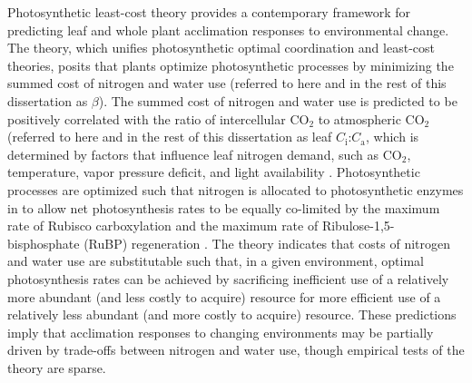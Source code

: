Photosynthetic least-cost theory  provides a contemporary framework for predicting leaf and whole plant acclimation responses to environmental change. The theory, which unifies photosynthetic optimal coordination  and least-cost  theories, posits that plants optimize photosynthetic processes by minimizing the summed cost of nitrogen and water use (referred to here and in the rest of this dissertation as $\beta$). The summed cost of nitrogen and water use is predicted to be positively correlated with the ratio of intercellular CO$_2$ to atmospheric CO$_2$ (referred to here and in the rest of this dissertation as leaf $C_\mathrm{i}$:$C_\mathrm{a}$, which is determined by factors that influence leaf nitrogen demand, such as CO$_2$, temperature, vapor pressure deficit, and light availability . Photosynthetic processes are optimized such that nitrogen is allocated to photosynthetic enzymes in to allow net photosynthesis rates to be equally co-limited by the maximum rate of Rubisco carboxylation and the maximum rate of Ribulose-1,5-bisphosphate (RuBP) regeneration . The theory indicates that costs of nitrogen and water use are substitutable such that, in a given environment, optimal photosynthesis rates can be achieved by sacrificing inefficient use of a relatively more abundant (and less costly to acquire) resource for more efficient use of a relatively less abundant (and more costly to acquire) resource. These predictions imply that acclimation responses to changing environments may be partially driven by trade-offs between nitrogen and water use, though empirical tests of the theory are sparse.

